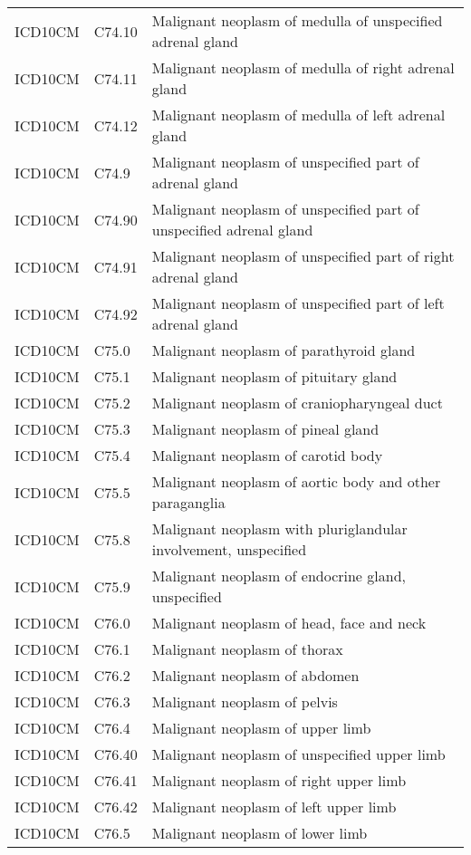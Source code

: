 \begin{table}[ht]
\begin{tabular}{lll}
  ICD10CM & C74.10 & Malignant neoplasm of medulla of unspecified adrenal gland \\ 
  ICD10CM & C74.11 & Malignant neoplasm of medulla of right adrenal gland \\ 
  ICD10CM & C74.12 & Malignant neoplasm of medulla of left adrenal gland \\ 
  ICD10CM & C74.9 & Malignant neoplasm of unspecified part of adrenal gland \\ 
  ICD10CM & C74.90 & Malignant neoplasm of unspecified part of unspecified adrenal gland \\ 
  ICD10CM & C74.91 & Malignant neoplasm of unspecified part of right adrenal gland \\ 
  ICD10CM & C74.92 & Malignant neoplasm of unspecified part of left adrenal gland \\ 
  ICD10CM & C75.0 & Malignant neoplasm of parathyroid gland \\ 
  ICD10CM & C75.1 & Malignant neoplasm of pituitary gland \\ 
  ICD10CM & C75.2 & Malignant neoplasm of craniopharyngeal duct \\ 
  ICD10CM & C75.3 & Malignant neoplasm of pineal gland \\ 
  ICD10CM & C75.4 & Malignant neoplasm of carotid body \\ 
  ICD10CM & C75.5 & Malignant neoplasm of aortic body and other paraganglia \\ 
  ICD10CM & C75.8 & Malignant neoplasm with pluriglandular involvement, unspecified \\ 
  ICD10CM & C75.9 & Malignant neoplasm of endocrine gland, unspecified \\ 
  ICD10CM & C76.0 & Malignant neoplasm of head, face and neck \\ 
  ICD10CM & C76.1 & Malignant neoplasm of thorax \\ 
  ICD10CM & C76.2 & Malignant neoplasm of abdomen \\ 
  ICD10CM & C76.3 & Malignant neoplasm of pelvis \\ 
  ICD10CM & C76.4 & Malignant neoplasm of upper limb \\ 
  ICD10CM & C76.40 & Malignant neoplasm of unspecified upper limb \\ 
  ICD10CM & C76.41 & Malignant neoplasm of right upper limb \\ 
  ICD10CM & C76.42 & Malignant neoplasm of left upper limb \\ 
  ICD10CM & C76.5 & Malignant neoplasm of lower limb \\ 

\end{tabular}
\end{table}
